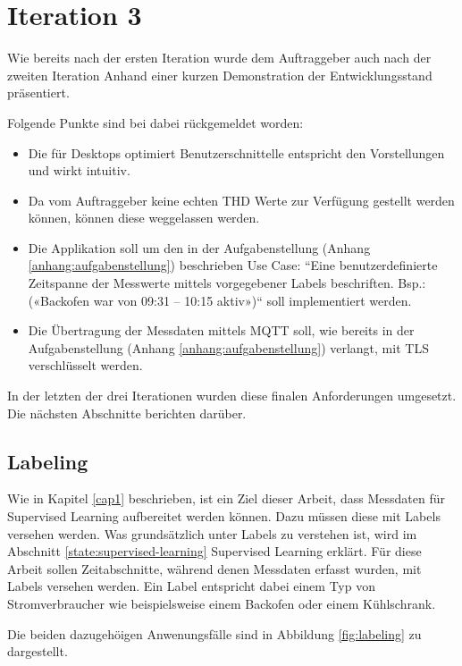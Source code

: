 \section{Iteration 3}
Wie bereits nach der ersten Iteration wurde dem Auftraggeber auch nach der zweiten Iteration
Anhand einer kurzen Demonstration der Entwicklungsstand präsentiert.

Folgende Punkte sind bei dabei rückgemeldet worden:
\begin{itemize}
    \item Die für Desktops optimiert Benutzerschnittelle entspricht den Vorstellungen und wirkt intuitiv.
    \item Da vom Auftraggeber keine echten \ac{THD} Werte zur Verfügung gestellt werden können,
          können diese weggelassen werden.
    \item Die Applikation soll um den in der Aufgabenstellung (Anhang \ref{anhang:aufgabenstellung}) beschrieben Use Case:
          ``Eine benutzerdefinierte Zeitspanne der Messwerte mittels vorgegebener
          Labels beschriften. Bsp.: («Backofen war von 09:31 – 10:15 aktiv»)`` soll implementiert werden.
    \item Die Übertragung der Messdaten mittels \ac{MQTT} soll,
          wie bereits in der Aufgabenstellung (Anhang \ref{anhang:aufgabenstellung}) verlangt, mit \ac{TLS} verschlüsselt werden.
\end{itemize}
In der letzten der drei Iterationen wurden diese finalen Anforderungen umgesetzt.
Die nächsten Abschnitte berichten darüber.

\subsection{Labeling}
Wie in Kapitel \ref{cap1} beschrieben, ist ein Ziel dieser Arbeit,
dass Messdaten für Supervised Learning aufbereitet werden können.
Dazu müssen diese mit Labels versehen werden.
Was grundsätzlich unter Labels zu verstehen ist, wird im Abschnitt \ref{state:supervised-learning} Supervised Learning erklärt.
Für diese Arbeit sollen Zeitabschnitte, während denen Messdaten erfasst wurden, mit Labels versehen werden.
Ein Label entspricht dabei einem Typ von Stromverbraucher wie beispielsweise einem Backofen oder einem Kühlschrank.

Die beiden dazugehöigen Anwenungsfälle sind in Abbildung \ref{fig:labeling} zu dargestellt.

